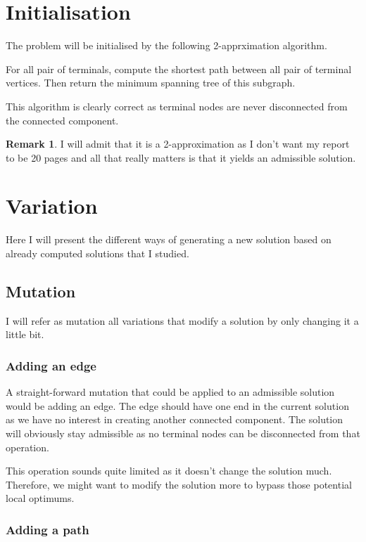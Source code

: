 \documentclass{article}
\theoremstyle{plain} %
\theoremstyle{definition} %
\newtheorem{remark}[theorem]{Remark}
\begin{document}
\section{Initialisation}

The problem will be initialised by the following 2-apprximation algorithm.

For all pair of terminals, compute the shortest path between all pair of
terminal vertices. Then return the minimum spanning tree of this subgraph.

This algorithm is clearly correct as terminal nodes are never disconnected from
the connected component.

\begin{remark} I will admit that it is a 2-approximation as I don't want my
report to be 20 pages and all that really matters is that it yields an
admissible solution.
\end{remark}

\section{Variation}

Here I will present the different ways of generating a new solution based on
already computed solutions that I studied.

\subsection{Mutation}

I will refer as mutation all variations that modify a solution by only changing
it a little bit.

\subsubsection{Adding an edge}

A straight-forward mutation that could be applied to an admissible solution
would be adding an edge. The edge should have one end in the current solution
as we have no interest in creating another connected component. The solution
will obviously stay admissible as no terminal nodes can be disconnected from
that operation.

This operation sounds quite limited as it doesn't change the solution much.
Therefore, we might want to modify the solution more to bypass those potential
local optimums.

\subsubsection{Adding a path}
\end{document}
